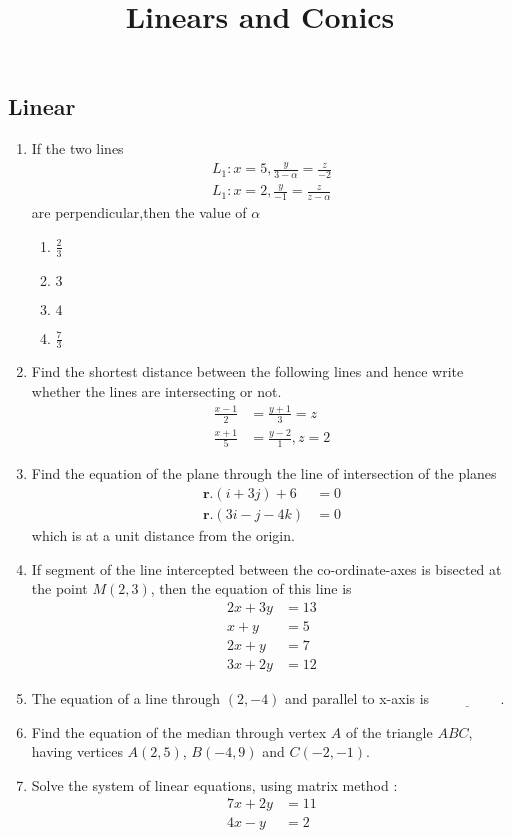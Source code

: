 \documentclass{article}
\let\vec\mathbf{}
\providecommand{\brak}[1]{\ensuremath{\left(#1\right)}}
\let\vec\mathbf
\begin{document}
\begin{center}
\title{ Linears and Conics}
\date{}
\maketitle
\section{Linear}     
\end{center}
\begin{enumerate}
    \item If the two lines
    \begin{align}
          L_1 : x=5,\frac{y}{3-\alpha}=\frac{z}{-2}\\
         L_1 : x=2,\frac{y}{-1}=\frac{z}{z-\alpha} 
       \end{align}
  are perpendicular,then the value of $\alpha$ 
        \begin{enumerate}
        \item $\frac{2}{3}$
        \item $3$
        \item $4$
        \item $\frac{7}{3}$
    \end{enumerate}

    \item Find the shortest distance between the following lines and hence write
whether the lines are intersecting or not.
\begin{align}
    \frac{x-1}{2} &= \frac{y+1}{3} = z \\
    \frac{x+1}{5} &=\frac{y-2}{1},z=2
\end{align}

\item  Find the equation of the plane through the line of intersection of the planes 
\begin{align}
     \vec{r} .\brak{i+3j} + 6 &= 0 \\  \vec{r} .\brak{3i - j - 4k} &= 0
\end{align}
which is at a unit distance from the origin.
    \item If segment of the line intercepted between the co-ordinate-axes is bisected
at the point $M\brak{2, 3}$, then the equation of this line is
 \begin{align}
       2x + 3y &= 13\\
       x + y &= 5 \\
       2x + y &= 7\\
       3x + 2y &= 12
\end{align}
\item The equation of a line through $(2,-4)$ and parallel to x-axis is $\underline{\hspace{2cm}}$.
\item Find the equation of the median through vertex $A$ of the triangle $ABC$, having vertices $A\brak{2,5}$, $B\brak{-4,9}$ and $C\brak{-2, -1}$.
\item Solve the system of linear equations, using matrix method : 
\begin{align}
  7x + 2y &= 11\\
 4x - y &= 2
\end{align}
\end{enumerate}
\end{document}
